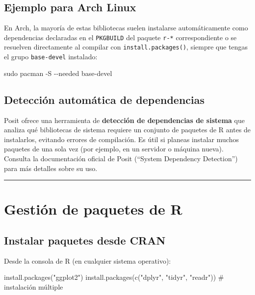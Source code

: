 \documentclass[
  man,
  floatsintext,
  longtable,
  a4paper,
  nolmodern,
  notxfonts,
  notimes,
  12pt,
  colorlinks=true,linkcolor=blue,citecolor=blue,urlcolor=blue]{apa7}
\newenvironment{Shaded}{\begin{snugshade}}{\end{snugshade}}
\newcommand{\AttributeTok}[1]{\textcolor[rgb]{0.40,0.45,0.13}{#1}}
\newcommand{\CommentTok}[1]{\textcolor[rgb]{0.37,0.37,0.37}{#1}}
\newcommand{\FunctionTok}[1]{\textcolor[rgb]{0.28,0.35,0.67}{#1}}
\newcommand{\NormalTok}[1]{\textcolor[rgb]{0.00,0.23,0.31}{#1}}
\newcommand{\StringTok}[1]{\textcolor[rgb]{0.13,0.47,0.30}{#1}}
\begin{document}
\subsection{Ejemplo para Arch Linux}\label{ejemplo-para-arch-linux}

En Arch, la mayoría de estas bibliotecas suelen instalarse
automáticamente como dependencias declaradas en el \texttt{PKGBUILD} del
paquete \texttt{r-*} correspondiente o se resuelven directamente al
compilar con \texttt{install.packages()}, siempre que tengas el grupo
\texttt{base-devel} instalado:

\begin{Shaded}
\begin{Highlighting}[]
\FunctionTok{sudo}\NormalTok{ pacman }\AttributeTok{{-}S} \AttributeTok{{-}{-}needed}\NormalTok{ base{-}devel}
\end{Highlighting}
\end{Shaded}

\subsection{Detección automática de
dependencias}\label{detecciuxf3n-automuxe1tica-de-dependencias}

Posit ofrece una herramienta de \textbf{detección de dependencias de
sistema} que analiza qué bibliotecas de sistema requiere un conjunto de
paquetes de R antes de instalarlos, evitando errores de compilación. Es
útil si planeas instalar muchos paquetes de una sola vez (por ejemplo,
en un servidor o máquina nueva). Consulta la documentación oficial de
Posit (``System Dependency Detection'') para más detalles sobre su uso.

\begin{center}\rule{0.5\linewidth}{0.5pt}\end{center}

\section{Gestión de paquetes de R}\label{gestiuxf3n-de-paquetes-de-r}

\subsection{Instalar paquetes desde
CRAN}\label{instalar-paquetes-desde-cran}

Desde la consola de R (en cualquier sistema operativo):

\begin{Shaded}
\begin{Highlighting}[]
\FunctionTok{install.packages}\NormalTok{(}\StringTok{"ggplot2"}\NormalTok{)}
\FunctionTok{install.packages}\NormalTok{(}\FunctionTok{c}\NormalTok{(}\StringTok{"dplyr"}\NormalTok{, }\StringTok{"tidyr"}\NormalTok{, }\StringTok{"readr"}\NormalTok{))  }\CommentTok{\# instalación múltiple}
\end{Highlighting}
\end{Shaded}
\end{document}
